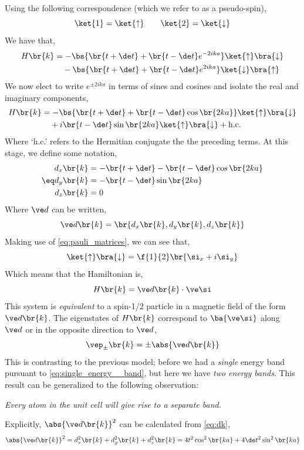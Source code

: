 \documentclass{article}
\begin{document}
Using the following correspondence (which we refer to as a pseudo-spin),
\[ \ket{1} = \ket{\uparrow} \qquad \ket{2} = \ket{\downarrow} \]
We have that,
\begin{align*}
H\br{k}
&= -\bs{\br{t + \de t} + \br{t - \de t} e^{- 2 i k a}} \ket{\uparrow}\bra{\downarrow}\\
&\quad - \bs{\br{t + \de t} + \br{t - \de t} e^{2 i k a}} \ket{\downarrow}\bra{\uparrow}
\end{align*}
We now elect to write $e^{\pm 2 i ka}$ in terms of sines and cosines and isolate the real and imaginary components,
\begin{align*}
H\br{k}
&= -\bs{\br{t + \de t} + \br{t - \de t} \cos\br{2 k a}} \ket{\uparrow}\bra{\downarrow}\\
&\quad + i\br{t - \de t} \sin\br{2 k a} \ket{\uparrow}\bra{\downarrow} + \text{h.c.}
\end{align*}
Where `h.c.' refers to the Hermitian conjugate the the preceding terms. At this stage, we define some notation,
\begin{align*}
\eq \label{eq:dk}
\begin{split}
d_x \br{k} &= - \br{t + \de t} - \br{t - \de t} \cos\br{2 ka} \\
d_y \br{k} &= - \br{t - \de t} \sin\br{2 ka} \\
d_z \br{k} &= 0
\end{split}
\end{align*}
Where $\ve d$ can be written,
\[ \ve d \br{k} = \br{d_x \br{k}, d_y \br{k}, d_z\br{k}} \]
Making use of \cref{eq:pauli_matrices}, we can see that,
\[ \ket{\uparrow}\bra{\downarrow} = \f{1}{2}\br{\si_x + i \si_y} \]
Which means that the Hamiltonian is,
\[ H\br{k} = \ve d\br{k} \cdot \ve \si \]
This system is \textit{equivalent} to a spin-1/2 particle in a magnetic field of the form $\ve d\br{k}$. The eigenstates of $H\br{k}$ correspond to $\ba{\ve \si}$ along $\ve d$ or in the opposite direction to $\ve d$,
\[ \vep_{\pm}\br{k} = \pm \abs{\ve d \br{k}} \]
This is contrasting to the previous model; before we had a \textit{single} energy band pursuant to \cref{eq:single_energy__band}, but here we have \textit{two energy bands}. This result can be generalized to the following observation:
\begin{center}
    \textit{Every atom in the unit cell will give rise to a separate band.}
\end{center}
Explicitly, $\abs{\ve d \br{k}}^2$ can be calculated from \cref{eq:dk},
\[ \abs{\ve d \br{k}}^2 = d_x^2 \br{k} + d_y^2 \br{k} + d_z^2 \br{k} = 4 t^2 \cos^2 \br{ka} + 4 \de t^2 \sin^2 \br{ka} \]
\end{document}

